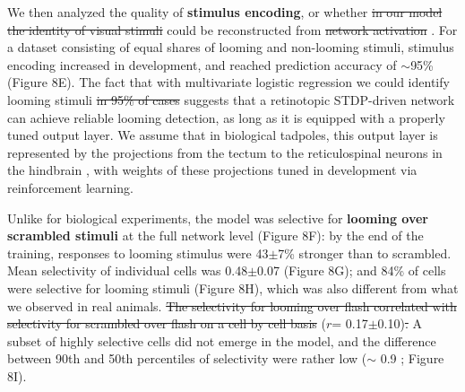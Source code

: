 \documentclass{article}
\providecommand{\DIFaddtex}[1]{{\protect\color{blue}{#1}}} %
\providecommand{\DIFdeltex}[1]{{\protect\color{red}\sout{#1}}}                      %
\providecommand{\DIFaddbegin}{} %
\providecommand{\DIFaddend}{} %
\providecommand{\DIFdelbegin}{} %
\providecommand{\DIFdelend}{} %
\providecommand{\DIFadd}[1]{\texorpdfstring{\DIFaddtex{#1}}{#1}} %
\providecommand{\DIFdel}[1]{\texorpdfstring{\DIFdeltex{#1}}{}} %
\newcommand{\DIFscaledelfig}{0.5}
\newlength{\DIFdelgraphicswidth} %
\newlength{\DIFdelgraphicsheight} %
\newcommand{\DIFaddincludegraphics}[2][]{{\color{blue}\fbox{\DIFOincludegraphics[#1]{#2}}}} %
\newcommand{\DIFdelincludegraphics}[2][]{%
\sbox{\DIFdelgraphicsbox}{\DIFOincludegraphics[#1]{#2}}%
\settoboxwidth{\DIFdelgraphicswidth}{\DIFdelgraphicsbox} %
\settoboxtotalheight{\DIFdelgraphicsheight}{\DIFdelgraphicsbox} %
\scalebox{\DIFscaledelfig}{%
\parbox[b]{\DIFdelgraphicswidth}{\usebox{\DIFdelgraphicsbox}\\[-\baselineskip] \rule{\DIFdelgraphicswidth}{0em}}\llap{\resizebox{\DIFdelgraphicswidth}{\DIFdelgraphicsheight}{%
\setlength{\unitlength}{\DIFdelgraphicswidth}%
\begin{picture}(1,1)%
\thicklines\linethickness{2pt} %
{\color[rgb]{1,0,0}\put(0,0){\framebox(1,1){}}}%
{\color[rgb]{1,0,0}\put(0,0){\line( 1,1){1}}}%
{\color[rgb]{1,0,0}\put(0,1){\line(1,-1){1}}}%
\end{picture}%
}\hspace*{3pt}}} %
} %
\DeclareRobustCommand{\DIFaddbegin}{\DIFOaddbegin \let\includegraphics\DIFaddincludegraphics} %
\DeclareRobustCommand{\DIFaddend}{\DIFOaddend \let\includegraphics\DIFOincludegraphics} %
\DeclareRobustCommand{\DIFdelbegin}{\DIFOdelbegin \let\includegraphics\DIFdelincludegraphics} %
\DeclareRobustCommand{\DIFdelend}{\DIFOaddend \let\includegraphics\DIFOincludegraphics} %
\begin{document}
We then analyzed the quality of \textbf{stimulus encoding}, or whether \DIFdelbegin \DIFdel{in our model the identity of visual stimuli }\DIFdelend \DIFaddbegin \DIFadd{stimulus identity }\DIFaddend could be reconstructed from \DIFdelbegin \DIFdel{network activation }\DIFdelend \DIFaddbegin \DIFadd{the total activation of every cell in the network, similar to how we did it for biological experiments}\DIFaddend . For a dataset consisting of equal shares of looming and non-looming stimuli, stimulus encoding increased in development, and reached prediction accuracy of $\sim$95\% (Figure 8E). The fact that with multivariate logistic regression we could identify looming stimuli \DIFdelbegin \DIFdel{in 95\% of cases }\DIFdelend \DIFaddbegin \DIFadd{so well }\DIFaddend suggests that a retinotopic STDP-driven network can achieve reliable looming detection, as long as it is equipped with a properly tuned output layer. We assume that in biological tadpoles, this output layer is represented by the projections from the tectum to the reticulospinal neurons in the hindbrain \citep{helmbrecht2018topography}, with weights of these projections tuned in development via reinforcement learning.

Unlike for biological experiments, the model was selective for \textbf{looming over scrambled stimuli} at the full network level (Figure 8F): by the end of the training, responses to looming stimulus were 43$\pm$7\% stronger than to scrambled. Mean selectivity of individual cells was 0.48$\pm$0.07 (Figure 8G); and 84\% of cells were selective for looming stimuli (Figure 8H), which was also different from what we observed in real animals. \DIFdelbegin \DIFdel{The selectivity for looming over flash correlated with selectivity for scrambled over flash on a cell by cell basis }\DIFdelend \DIFaddbegin \DIFadd{Across cells within each network, looming-over-flash selectivity only weakly correlated with scrambled-over-flash selectivity }\DIFaddend ($r$= 0.17$\pm$0.10)\DIFdelbegin \DIFdel{. }\DIFdelend \DIFaddbegin \DIFadd{, which was unlike high correlation (r$\sim$0.8) observed in imaging experiments. On the contrary, looming-over-flash selectivity strongly correlated with looming-over-scramble selectivity in the model ($r$=0.91$\pm$0.02), while it was not present in imaging experiments (to r$\sim$0.03). This suggests that while in the biological tectum selectivity was strongly influenced by activation dynamics, in the model it was largely driven by the stimulus geometry. }\DIFaddend A subset of highly selective cells did not emerge in the model, and the difference between 90th and 50th percentiles of selectivity were rather low ($\sim$ 0.9 ; Figure 8I).
\end{document}
